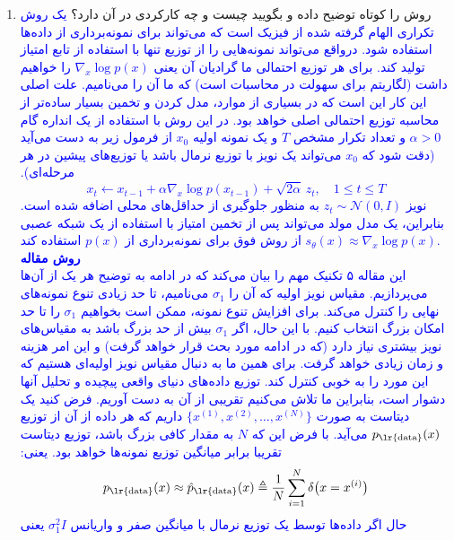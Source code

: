 \documentclass[12pt]{article}
\begin{document}
\begin{enumerate}
    \begin{enumerate}
        \item روش را کوتاه توضیح داده و بگویید  چیست و چه کارکردی در آن دارد؟
        \textcolor{blue}{
         یک روش تکراری الهام گرفته شده از فیزیک است که می‌تواند برای نمونه‌برداری از داده‌ها استفاده شود. درواقع می‌تواند نمونه‌هایی را از توزیع  تنها با استفاده از تابع امتیاز تولید کند. برای هر توزیع احتمالی  ما گرادیان آن یعنی $\nabla_x \log p(x)$
         را خواهیم داشت (لگاریتم برای سهولت در محاسبات است) که ما آن را  می‌نامیم. علت اصلی این کار این است که در بسیاری از موارد، مدل کردن و تخمین  بسیار ساده‌تر از محاسبه توزیع احتمالی اصلی خواهد بود. در این روش با استفاده از یک انداره گام $\alpha > 0
        $ و تعداد تکرار مشخص $T$ و یک نمونه اولیه $x_0$ از فرمول زیر به دست می‌آید (دقت شود که $x_0$ می‌تواند یک نویز با توزیع نرمال باشد یا توزیع‌های پیشین در هر مرحله‌ای).
        $$
        x_t \leftarrow x_{t-1} + \alpha \nabla_x \log p(x_{t-1}) + \sqrt{2\alpha}\, z_t, \quad 1 \leq t \leq T
        $$
        نویز $z_t \sim \mathcal{N}(0, I)$ به منظور جلوگیری از حداقل‌های محلی اضافه شده است. بنابراین، یک مدل مولد می‌تواند پس از تخمین امتیاز با استفاده از یک شبکه عصبی $s_\theta(x) \approx \nabla_x \log p(x)$ از روش فوق برای نمونه‌برداری از $p(x)$ استفاده کند.\\        
        \textbf{روش مقاله}\\
        این مقاله ۵ تکنیک مهم را بیان می‌کند که در ادامه به توضیح هر یک از آن‌ها می‌پردازیم.
        مقیاس نویز اولیه که آن را $\sigma_1$ می‌نامیم، تا حد زیادی تنوع نمونه‌های نهایی را کنترل می‌کند. برای افزایش تنوع نمونه، ممکن است بخواهیم $\sigma_1$ را تا حد امکان بزرگ انتخاب کنیم. با این حال، اگر $\sigma_1$ بیش از حد بزرگ باشد به مقیاس‌های نویز بیشتری نیاز دارد (که در ادامه مورد بحث قرار خواهد گرفت) و این امر هزینه و زمان زیادی خواهد گرفت. برای همین ما به دنبال مقیاس نویز اولیه‌ای هستیم که این مورد را به خوبی کنترل کند.
        توزیع داده‌های دنیای واقعی پیچیده و تحلیل آنها دشوار است، بنابراین ما تلاش می‌کنیم تقریبی از آن به دست آوریم. فرض کنید یک دیتاست به صورت $\{ x^{(1)}, x^{(2)}, \dots, x^{(N)} \}$
        داریم که هر داده از آن از توزیع $p_{\text{\lr{data}}}(x)$ می‌آید. با فرض این که $N$ به مقدار کافی بزرگ باشد، توزیع دیتاست تقریبا برابر میانگین توزیع نمونه‌ها خواهد بود. یعنی:
        $$
        p_{\text{\lr{data}}}(x) \approx \hat{p}_{\text{\lr{data}}}(x) \triangleq \frac{1}{N} \sum_{i=1}^{N} \delta\big(x = x^{(i)}\big)
        $$
        حال اگر داده‌ها توسط یک توزیع نرمال با میانگین صفر و واریانس $\sigma_1^2 I$ یعنی 
}
\end{enumerate}
\end{enumerate}
\end{document}
